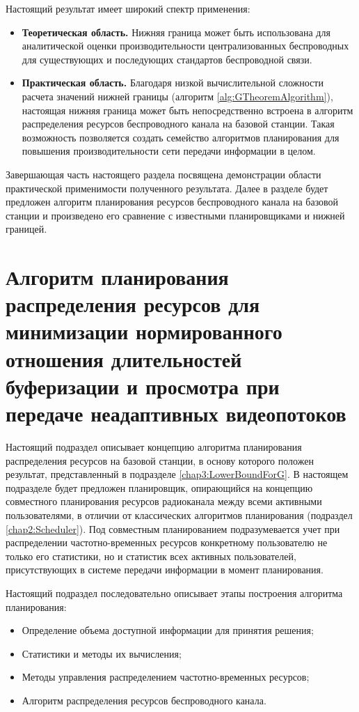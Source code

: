 Настоящий результат имеет широкий спектр применения:
\begin{itemize}
	\item \textbf{Теоретическая область.} Нижняя граница может быть использована для аналитической оценки производительности централизованных беспроводных для существующих и последующих стандартов беспроводной связи.
	\item \textbf{Практическая область.} Благодаря низкой вычислительной сложности расчета значений нижней границы (алгоритм \ref{alg:GTheoremAlgorithm}), настоящая нижняя граница может быть непосредственно встроена в алгоритм распределения ресурсов беспроводного канала на базовой станции. Такая возможность позволяется создать семейство алгоритмов планирования для повышения производительности сети передачи информации в целом.
\end{itemize}

Завершающая часть настоящего раздела посвящена демонстрации области практической применимости полученного результата. Далее в разделе будет предложен алгоритм планирования ресурсов беспроводного канала на базовой станции и произведено его сравнение с известными планировщиками и нижней границей.

\section{Алгоритм планирования распределения ресурсов для минимизации нормированного отношения длительностей буферизации и просмотра при передаче неадаптивных видеопотоков}
\label{chap3:NonAdaptiveScheduler}

Настоящий подраздел описывает концепцию алгоритма планирования распределения ресурсов на базовой станции, в основу которого положен результат, представленный в подразделе \ref{chap3:LowerBoundForG}. В настоящем подразделе будет предложен планировщик, опирающийся на концепцию совместного планирования ресурсов радиоканала между всеми активными пользователями, в отличии от классических алгоритмов планирования (подраздел \ref{chap2:Scheduler}). Под совместным планированием подразумевается учет при распределении частотно-временных ресурсов конкретному пользователю не только его статистики, но и статистик всех активных пользователей, присутствующих в системе передачи информации в момент планирования.

Настоящий подраздел последовательно описывает этапы построения алгоритма планирования:
\begin{itemize}
	\item Определение объема доступной информации для принятия решения;
	\item Статистики и методы их вычисления;
	\item Методы управления распределением частотно-временных ресурсов;
	\item Алгоритм распределения ресурсов беспроводного канала.
\end{itemize}

